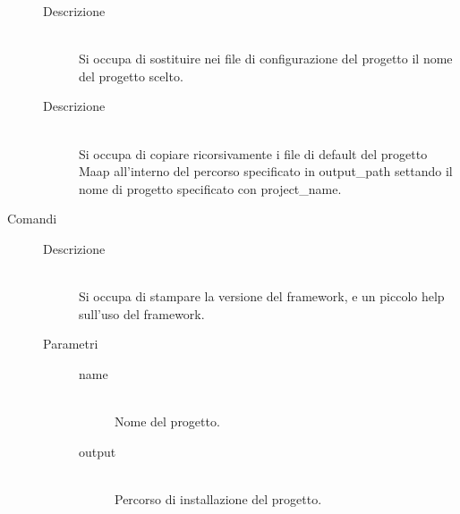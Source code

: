 \begin{description}
\begin{mldescription}
\begin{description}
\begin{description}
         	     \end{description}
    \item[Descrizione] \hfill \\
    Si occupa di sostituire nei file di configurazione del progetto il nome del progetto scelto.
   \end{description}

    \hfill
   \begin{description}
  
    \item[Descrizione] \hfill \\
	    Si occupa di copiare ricorsivamente i file di default del progetto Maap all'interno del percorso specificato in output\_path settando il nome di progetto specificato con project\_name.
   \end{description}
   \end{mldescription}
   \item[Comandi]
     \begin{mldescription}
       \hfill
      \begin{description}
       \item[Descrizione] \hfill \\
       Si occupa di stampare la versione del framework, e un piccolo help sull'uso del framework.
      \end{description}
       \hfill
            \begin{description}
            \item[Parametri] \hfill 
                         	     \begin{description}
                         	      \item[name] \hfill \\
                         	      Nome del progetto.
                         	      \item[output] \hfill \\
                         	      Percorso di installazione del progetto.
                         	      

\end{description}
\end{description}
\end{mldescription}
\end{description}
